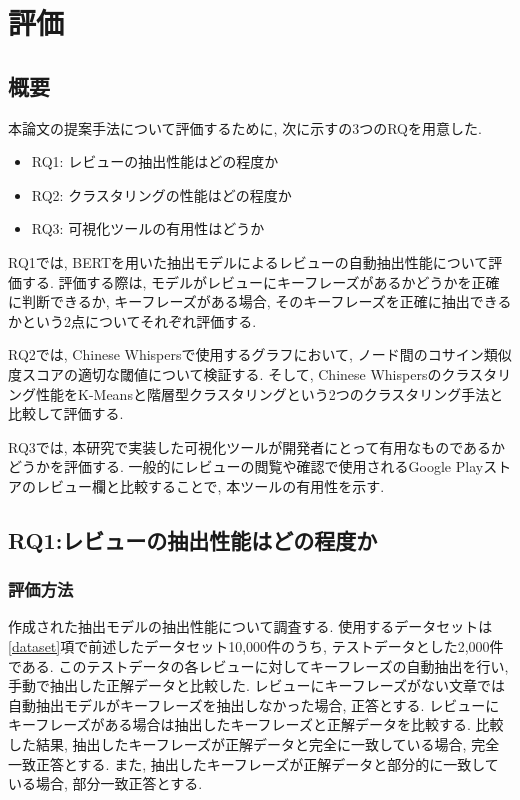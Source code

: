 \chapter{評価}
\label{chap:kekkahyouka}

\section{概要}
本論文の提案手法について評価するために, 次に示すの3つのRQを用意した. 

\begin{itemize}
  \item RQ1: レビューの抽出性能はどの程度か
  \item RQ2: クラスタリングの性能はどの程度か
  \item RQ3: 可視化ツールの有用性はどうか
\end{itemize}

RQ1では, BERTを用いた抽出モデルによるレビューの自動抽出性能について評価する. 評価する際は, モデルがレビューにキーフレーズがあるかどうかを正確に判断できるか, キーフレーズがある場合, そのキーフレーズを正確に抽出できるかという2点についてそれぞれ評価する. 

RQ2では, Chinese Whispersで使用するグラフにおいて, ノード間のコサイン類似度スコアの適切な閾値について検証する. そして, Chinese Whispersのクラスタリング性能をK-Meansと階層型クラスタリングという2つのクラスタリング手法と比較して評価する. 

RQ3では, 本研究で実装した可視化ツールが開発者にとって有用なものであるかどうかを評価する. 一般的にレビューの閲覧や確認で使用されるGoogle Playストアのレビュー欄と比較することで, 本ツールの有用性を示す. 

\section{RQ1:レビューの抽出性能はどの程度か}
\subsection{評価方法}\label{method}
作成された抽出モデルの抽出性能について調査する. 使用するデータセットは\ref{dataset}項で前述したデータセット10,000件のうち, テストデータとした2,000件である. このテストデータの各レビューに対してキーフレーズの自動抽出を行い, 手動で抽出した正解データと比較した. 
レビューにキーフレーズがない文章では自動抽出モデルがキーフレーズを抽出しなかった場合, 正答とする. レビューにキーフレーズがある場合は抽出したキーフレーズと正解データを比較する. 
比較した結果, 抽出したキーフレーズが正解データと完全に一致している場合, 完全一致正答とする. また, 抽出したキーフレーズが正解データと部分的に一致している場合, 部分一致正答とする. 

